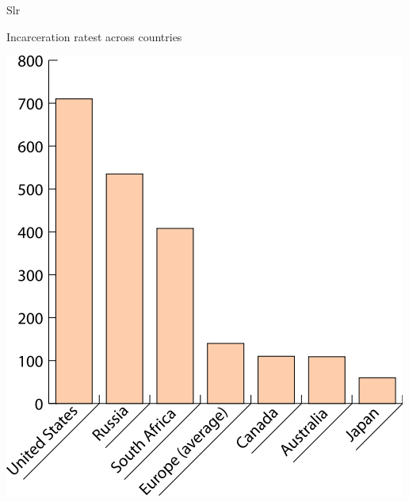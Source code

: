 \begin{chart}{S}{lr}
\caption{Incarceration ratest across countries}
\label{chart:incarceration}
\includegraphics[width=\chartwidth,height=\chartheight]{incarceration}  
\end{chart}

\lipsum[1-4]
\lipsum[1-5] 




